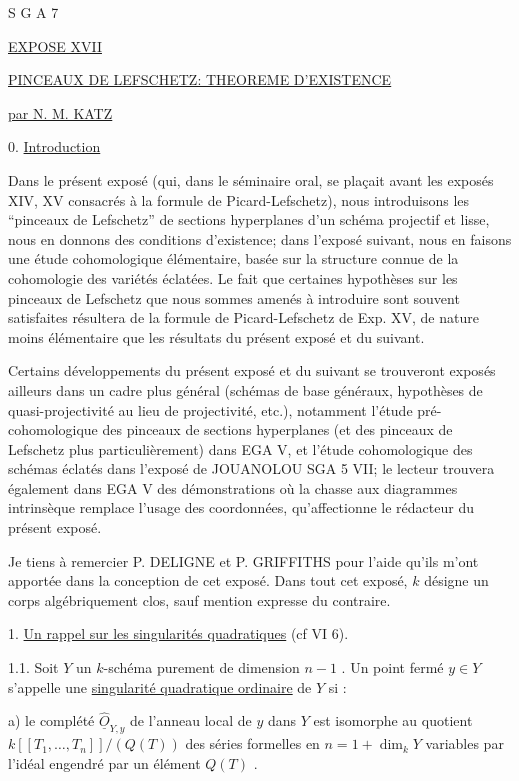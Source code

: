 


S G A 7


\underline{EXPOSE XVII}


\underline{\underline{PINCEAUX DE LEFSCHETZ: THEOREME D'EXISTENCE}}


\underline{par N. M. KATZ}


0. \underline{Introduction}

Dans le présent exposé (qui, dans le séminaire oral, se plaçait avant les exposés XIV, XV consacrés à la formule de Picard-Lefschetz), nous introduisons les ``pinceaux de Lefschetz'' de sections hyperplanes d'un schéma projectif et lisse, nous en donnons des conditions d'existence; dans l'exposé suivant, nous en faisons une étude cohomologique élémentaire, basée sur la structure connue de la cohomologie des variétés éclatées. Le fait que certaines hypothèses sur les pinceaux de Lefschetz que nous sommes amenés à introduire sont souvent satisfaites résultera de la formule de Picard-Lefschetz de Exp. XV, de nature moins élémentaire que les résultats du présent exposé et du suivant.

Certains développements du présent exposé et du suivant se trouveront exposés ailleurs dans un cadre plus général (schémas de base généraux, hypothèses de quasi-projectivité au lieu de projectivité, etc.), notamment l'étude pré-cohomologique des pinceaux de sections hyperplanes (et des pinceaux de Lefschetz plus particulièrement) dans EGA V, et l'étude cohomologique des schémas éclatés dans
l'exposé de JOUANOLOU SGA 5 VII; le lecteur trouvera également dans EGA V des démonstrations où la chasse aux diagrammes intrinsèque remplace l'usage des coordonnées, qu'affectionne le rédacteur du présent exposé.

Je tiens à remercier P. DELIGNE et P. GRIFFITHS pour l'aide qu'ils m'ont apportée dans la conception de cet exposé. Dans tout cet exposé, $k$ désigne un corps algébriquement clos, sauf mention expresse du contraire.


1. \underline{Un rappel sur les singularités quadratiques} (cf VI 6).

1.1. \quad Soit $Y$ un $k$-schéma purement de dimension $n-1$ . Un point fermé $y \in Y$ s'appelle une \underline{singularité quadratique ordinaire} de $Y$ si :

a) le complété $\hat{\underline{O}}_{Y,y}$ de l'anneau local de $y$ dans $Y$ est isomorphe au quotient $k[[T_1,\ldots,T_n]]/(Q(T))$ des séries formelles en $n=1+\dim_k Y$ variables par l'idéal engendré par un élément $Q(T)$ .

